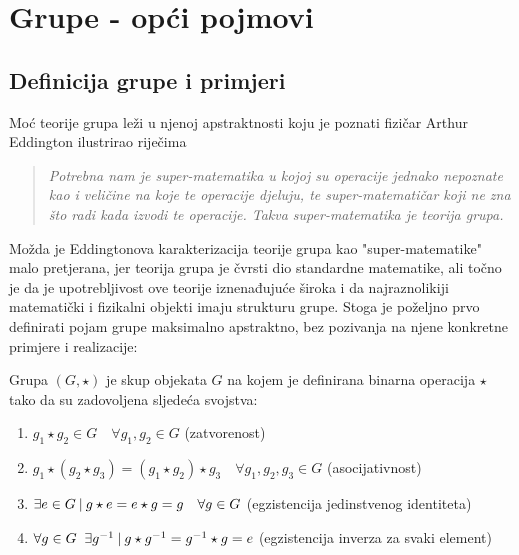
\chapter{Grupe - opći pojmovi}

\section{Definicija grupe i primjeri}


Moć teorije grupa leži u njenoj apstraktnosti koju je poznati fizičar Arthur
Eddington ilustrirao 
riječima
\begin{quote}
\emph{Potrebna nam je super-matematika u kojoj su operacije jednako nepoznate kao i
veličine na koje te operacije djeluju, te super-matematičar koji ne zna što radi kada
izvodi te operacije. Takva super-matematika je teorija grupa.}
\end{quote}
Možda je Eddingtonova karakterizacija teorije grupa kao "super-matematike" malo pretjerana, jer
teorija grupa je čvrsti dio standardne matematike, ali točno je da je upotrebljivost
ove teorije iznenađujuće široka i da najraznolikiji matematički i fizikalni objekti
imaju strukturu grupe.
Stoga je poželjno prvo definirati pojam grupe maksimalno apstraktno, bez pozivanja
na njene konkretne primjere i realizacije:

\begin{definicija}[Grupa] 
    \label{def:grupa}
Grupa $(G,\star)$ je skup objekata $G$ na kojem je definirana binarna operacija
 $\star$ tako da su zadovoljena sljedeća svojstva:
\begin{enumerate}
\item $g_1 \star g_2 \in G \quad \forall  g_1, g_2 \in G$  (zatvorenost)
\item $ g_1 \star (g_2 \star g_3) = (g_1 \star  g_2)\star g_3 \quad \forall 
    g_1, g_2, g_3 \in G$  (asocijativnost)
\item $\exists e \in G \: | \: g\star e = e \star g = g \quad \forall g\in G$
    (egzistencija jedinstvenog identiteta)
\item $\forall g\in G \;\; \exists g^{-1} \: | \: g\star g^{-1} = g^{-1}\star g =e$
    (egzistencija inverza za svaki element)
\end{enumerate}
\end{definicija}

